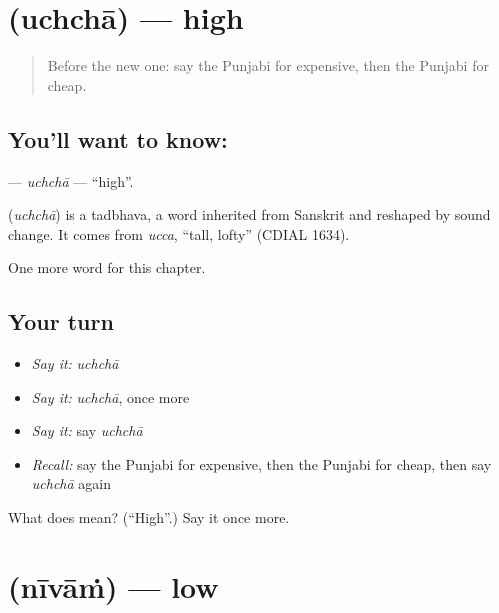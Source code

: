 \section[\texorpdfstring{\pa{ਉੱਚਾ} (uchchā)}{ਉੱਚਾ (uchchā)}]{ (uchchā) — high}

\label{lesson:PA-C81-uchcha}



\begin{quote}
Before the new one: say the Punjabi for expensive, then the Punjabi for cheap.
\end{quote}

\subsection*{You'll want to know: }
\textbf{} — \emph{uchchā} — \textquotedblleft{}high\textquotedblright{}.

\begin{cousinweb}
\textbf{} (\emph{uchchā}) is a tadbhava, a word inherited from Sanskrit and reshaped by sound change. It comes from \emph{ucca}, \textquotedblleft{}tall, lofty\textquotedblright{} (CDIAL 1634).
\end{cousinweb}

\begin{grammarlens}[title={What you've built}]
One more word for this chapter.
\end{grammarlens}

\subsection*{Your turn}
\begin{itemize}
\raggedright
  \item \emph{Say it:} \emph{uchchā}
  \item \emph{Say it:} \emph{uchchā}, once more
  \item \emph{Say it:} say \emph{uchchā}
  \item \emph{Recall:} say the Punjabi for expensive, then the Punjabi for cheap, then say \emph{uchchā} again
\end{itemize}

\begin{tcolorbox}[breakable,colback=teal!4,colframe=teal!35!black,title={Before you move on}]
What does  mean? (\textquotedblleft{}High\textquotedblright{}.) Say it once more.
\end{tcolorbox}
\section[\texorpdfstring{\pa{ਨੀਵਾਂ} (nīvāṁ)}{ਨੀਵਾਂ (nīvāṁ)}]{ (nīvāṁ) — low}

